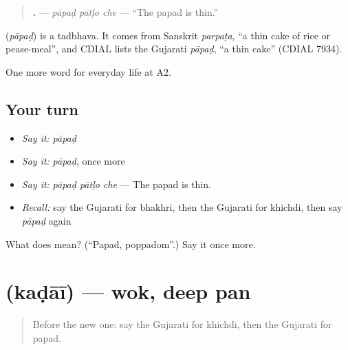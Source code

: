 \begin{quote}
\textbf{  .} — \emph{pāpaḍ pātḷo che} — \textquotedblleft{}The papad is thin.\textquotedblright{}
\end{quote}

\begin{cousinweb}
\textbf{} (\emph{pāpaḍ}) is a tadbhava. It comes from Sanskrit \emph{parpaṭa}, \textquotedblleft{}a thin cake of rice or pease-meal\textquotedblright{}, and CDIAL lists the Gujarati \emph{pāpaḍ}, \textquotedblleft{}a thin cake\textquotedblright{} (CDIAL 7934).
\end{cousinweb}

\begin{grammarlens}[title={What you've built}]
One more word for everyday life at A2.
\end{grammarlens}

\subsection*{Your turn}
\begin{itemize}
\raggedright
  \item \emph{Say it:} \emph{pāpaḍ}
  \item \emph{Say it:} \emph{pāpaḍ}, once more
  \item \emph{Say it:} \emph{pāpaḍ pātḷo che} — The papad is thin.
  \item \emph{Recall:} say the Gujarati for bhakhri, then the Gujarati for khichdi, then say \emph{pāpaḍ} again
\end{itemize}

\begin{tcolorbox}[breakable,colback=teal!4,colframe=teal!35!black,title={Before you move on}]
What does  mean? (\textquotedblleft{}Papad, poppadom\textquotedblright{}.) Say it once more.
\end{tcolorbox}
\section[\texorpdfstring{\gu{કડાઈ} (kaḍāī)}{કડાઈ (kaḍāī)}]{ (kaḍāī) — wok, deep pan}

\label{lesson:GU-C169-kadai}



\begin{quote}
Before the new one: say the Gujarati for khichdi, then the Gujarati for papad.
\end{quote}

